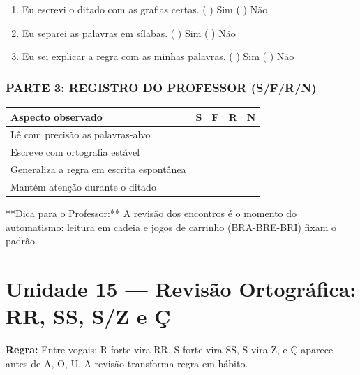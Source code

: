 \begin{exercicio}
\begin{enumerate}[label=\alph*)]
  \item Eu escrevi o ditado com as grafias certas.  \quad ( ) Sim   ( ) Não

  \item Eu separei as palavras em sílabas.  \quad ( ) Sim   ( ) Não

  \item Eu sei explicar a regra com as minhas palavras.  \quad ( ) Sim   ( ) Não

\end{enumerate}

\subsection*{PARTE 3: REGISTRO DO PROFESSOR (S/F/R/N)}

\begin{center}
\renewcommand{\arraystretch}{1.4}
\begin{tabular}{@{}p{9cm}cccc@{}}
\toprule
Aspecto observado & S & F & R & N \\
\midrule
Lê com precisão as palavras-alvo & & & & \\
Escreve com ortografia estável & & & & \\
Generaliza a regra em escrita espontânea & & & & \\
Mantém atenção durante o ditado & & & & \\
\bottomrule\end{tabular}\end{center}

\end{exercicio}

\begin{dica}
**Dica para o Professor:** A revisão dos encontros é o momento do automatismo: leitura em cadeia e jogos de carrinho (BRA-BRE-BRI) fixam o padrão.
\end{dica}


\chapter{Unidade 15 --- Revisão Ortográfica: RR, SS, S/Z e Ç}


\textbf{Regra:} Entre vogais: R forte vira RR, S forte vira SS, S vira Z, e Ç aparece antes de A, O, U. A revisão transforma regra em hábito.

